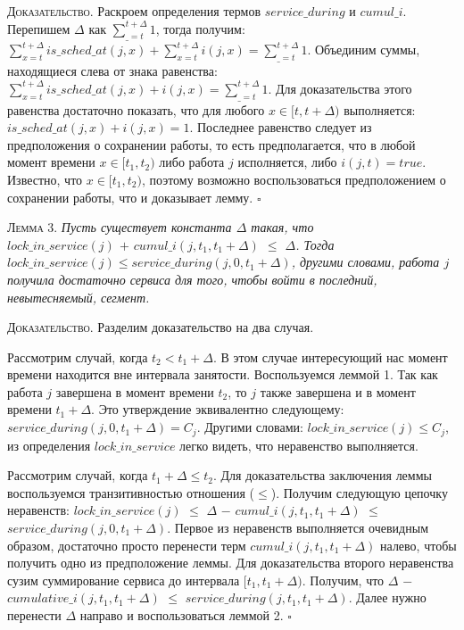 \textsc{Доказательство.}
  Раскроем определения термов $service\_during$ и $cumul\_i $.
  Перепишем $\Delta$ как $\sum_{\_ = t}^{t+\Delta}1$, тогда получим:
    $\sum_{x = t}^{t+\Delta} is\_sched\_at(j,x) + \sum_{x = t}^{t+\Delta} i(j,x) = \sum_{\_ = t}^{t+\Delta} 1 $.
  Объединим суммы, находящиеся слева от знака равенства:
    $\sum_{x = t}^{t+\Delta} is\_sched\_at(j,x) + i(j,x) = \sum_{\_ = t}^{t+\Delta} 1 $.
  Для доказательства этого равенства достаточно показать, что для любого $x \in [t, t + \Delta)$ выполняется:
    $is\_sched\_at(j,x) + i(j,x) = 1$.
  Последнее равенство следует из предположения о сохранении работы, то есть предполагается, что в любой момент времени $x \in [t_1, t_2)$ либо работа $j$ исполняется, либо $i(j,t) = true$. Известно, что $x \in [t_1, t_2)$, поэтому возможно
  воспользоваться предположением о сохранении работы, что и доказывает лемму. $\square$

\textsc{Лемма 3.}
\textit{Пусть существует константа $\Delta$ такая, что \\ $ lock\_in\_service(j)$ $+$ $cumul\_i(j, t_1, t_1 + \Delta) $ $\leq$ $ \Delta$. Тогда $lock\_in\_service(j) \leq service\_during(j, 0, t_1 + \Delta)$, другими словами, работа $j$ получила достаточно сервиса для того, чтобы войти в последний, невытесняемый, сегмент. }

\textsc{Доказательство.} Разделим доказательство на два случая.

Рассмотрим случай, когда \textit{$t_2 < t_1 + \Delta$}. В этом случае интересующий нас момент времени находится вне интервала занятости. Воспользуемся леммой 1. Так как работа $j$ завершена в момент времени $t_2$, то $j$ также завершена и в момент времени $t_1 + \Delta$. Это утверждение эквивалентно следующему: $service\_during(j, 0, t_1 + \Delta) = C_{j}$. Другими словами: $lock\_in\_service(j) \leq C_{j}$, из определения $lock\_in\_service$ легко видеть, что неравенство выполняется.

Рассмотрим случай, когда \textit{$t_1 + \Delta \leq t_2$}. Для доказательства заключения леммы воспользуемся транзитивностью отношения ($\leq$). Получим следующую цепочку неравенств:
  $lock\_in\_service(j) $ $\leq$ $ \Delta$ $-$ $cumul\_i(j, t_1, t_1 + \Delta)$ $\leq$ $service\_during(j, 0, t_1 + \Delta)$.
  Первое из неравенств выполняется очевидным образом, достаточно просто перенести терм
  $cumul\_i(j, t_1, t_1 + \Delta)$ налево, чтобы получить одно из предположение леммы.
  Для доказательства второго неравенства сузим суммирование сервиса до интервала $[t_1, t_1 + \Delta)$.
  Получим, что $ \Delta$ $-$ $cumulative\_i(j, t_1, t_1 + \Delta)$ $\leq$ $service\_during(j, t_1, t_1 + \Delta)$.
  Далее нужно перенести $\Delta$ направо и воспользоваться леммой 2. $\square$

